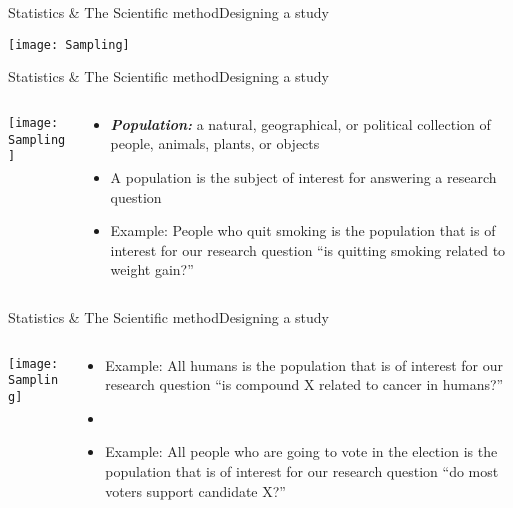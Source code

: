 \documentclass[xcolor=dvipsnames]{beamer}
\begin{document}
\begin{frame}{Statistics \& The Scientific method}{Designing a study}
	\vspace{-12pt}
	\begin{center}
		\texttt{[image: Sampling]}
	\end{center}
\end{frame}

\begin{frame}{Statistics \& The Scientific method}{Designing a study}
	\begin{columns}
		\begin{column}{0.5 \textwidth}
			\texttt{[image: Sampling]}
		\end{column}
		\begin{column}{0.5 \textwidth}
			\begin{itemize}
				\item \textbf{\emph{Population:}} a natural, geographical, or political collection of people, animals, plants, or objects
				\item A population is the subject of interest for answering a research question
				\item Example: People who quit smoking is the population that is of interest for our research question ``is quitting smoking related to weight gain?''
			\end{itemize}
		\end{column}
	\end{columns}
\end{frame}

\begin{frame}{Statistics \& The Scientific method}{Designing a study}
	\begin{columns}
		\begin{column}{0.5 \textwidth}
			\texttt{[image: Sampling]}
		\end{column}
		\begin{column}{0.5 \textwidth}
			\begin{itemize}
				\item Example: All humans is the population that is of interest for our research question “is compound X related to cancer in humans?”
				\item[]
				\item Example: All people who are going to vote in the election is the population that is of interest for our research question “do most voters support candidate X?”
			\end{itemize}
		\end{column}
	\end{columns}
\end{frame}
\end{document}
